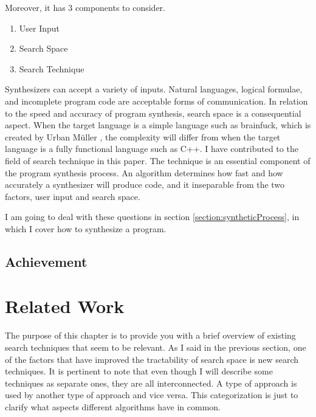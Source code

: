 \documentclass[12pt, a4paper, titlepage]{report}
\begin{document}
    Moreover, it has 3 components to consider.
    \begin{enumerate}
      \item User Input
      \item Search Space
      \item Search Technique
    \end{enumerate}
    Synthesizers can accept a variety of inputs.
    Natural languages, logical formulae, and incomplete program code are acceptable forms of communication.
    In relation to the speed and accuracy of program synthesis, search space is a consequential aspect.
    When the target language is a simple language such as brainfuck, which is created by Urban Müller \cite{easter:2020}, the complexity will differ from when the target language is a fully functional language such as C++.
    I have contributed to the field of search technique in this paper.
    The technique is an essential component of the program synthesis process.
    An algorithm determines how fast and how accurately a synthesizer will produce code, and it inseparable from the two factors, user input and search space.

    I am going to deal with these questions in section \ref{section:syntheticProcess}, in which I cover how to synthesize a program.

  \section{Achievement} %

\chapter{Related Work}\label{chapter:relatedWork}
  The purpose of this chapter is to provide you with a brief overview of existing search techniques that seem to be relevant. As I said in the previous section, one of the factors that have improved the tractability of search space is new search techniques.
  It is pertinent to note that even though I will describe some techniques as separate ones, they are all interconnected. A type of approach is used by another type of approach and vice versa. This categorization is just to clarify what aspects different algorithms have in common.
\end{document}
